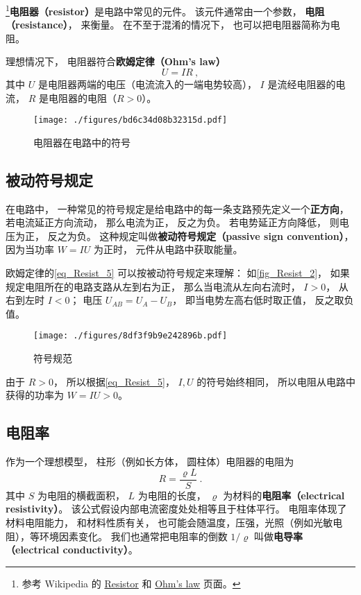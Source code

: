 

\footnote{参考 Wikipedia 的 \href{https://en.wikipedia.org/wiki/Resistor}{Resistor} 和 \href{https://en.wikipedia.org/wiki/Ohm's_law}{Ohm's law} 页面。}\textbf{电阻器（resistor）}是电路中常见的元件。 该元件通常由一个参数， \textbf{电阻（resistance）}， 来衡量。 在不至于混淆的情况下， 也可以把电阻器简称为电阻。

理想情况下， 电阻器符合\textbf{欧姆定律（Ohm's law）}
\begin{equation}\label{eq_Resist_5}
U = IR~,
\end{equation}
其中 $U$ 是电阻器两端的电压（电流流入的一端电势较高）， $I$ 是流经电阻器的电流， $R$ 是电阻器的电阻（$R > 0$）。

\begin{figure}[ht]
\centering
\texttt{[image: ./figures/bd6c34d08b32315d.pdf]}
\caption{电阻器在电路中的符号} \label{fig_Resist_3}
\end{figure}

\subsection{被动符号规定}\label{sub_Resist_1}
在电路中， 一种常见的符号规定是给电路中的每一条支路预先定义一个\textbf{正方向}， 若电流延正方向流动， 那么电流为正， 反之为负。 若电势延正方向降低， 则电压为正， 反之为负。 这种规定叫做\textbf{被动符号规定（passive sign convention）}， 因为当功率 $W = IU$ 为正时， 元件从电路中获取能量。

欧姆定律的\autoref{eq_Resist_5} 可以按被动符号规定来理解： 如\autoref{fig_Resist_2}， 如果规定电阻所在的电路支路从左到右为正， 那么当电流从左向右流时， $I > 0$， 从右到左时 $I < 0$； 电压 $U_{AB} = U_A - U_B$， 即当电势左高右低时取正值， 反之取负值。

\begin{figure}[ht]
\centering
\texttt{[image: ./figures/8df3f9b9e242896b.pdf]}
\caption{符号规范} \label{fig_Resist_2}
\end{figure}

由于 $R > 0$， 所以根据\autoref{eq_Resist_5}， $I, U$ 的符号始终相同， 所以电阻从电路中获得的功率为 $W = IU > 0$。

\subsection{电阻率}
作为一个理想模型， 柱形（例如长方体， 圆柱体）电阻器的电阻为
\begin{equation}
R = \frac{\varrho L}{S} ~.
\end{equation}
其中 $S$ 为电阻的横截面积， $L$ 为电阻的长度， $\varrho$ 为材料的\textbf{电阻率（electrical resistivity）}。 该公式假设内部电流密度处处相等且于柱体平行。 电阻率体现了材料电阻能力， 和材料性质有关， 也可能会随温度，压强，光照（例如光敏电阻），等环境因素变化。 我们也通常把电阻率的倒数 $1/\varrho$ 叫做\textbf{电导率（electrical conductivity）}。

